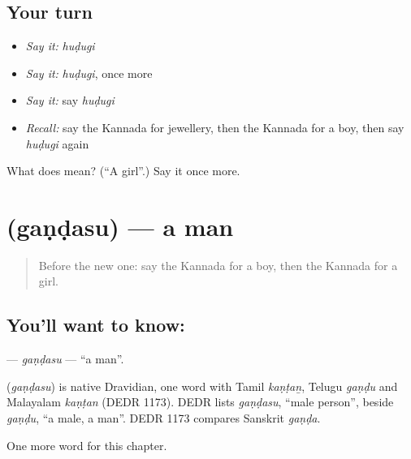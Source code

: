 \subsection*{Your turn}
\begin{itemize}
\raggedright
  \item \emph{Say it:} \emph{huḍugi}
  \item \emph{Say it:} \emph{huḍugi}, once more
  \item \emph{Say it:} say \emph{huḍugi}
  \item \emph{Recall:} say the Kannada for jewellery, then the Kannada for a boy, then say \emph{huḍugi} again
\end{itemize}

\begin{tcolorbox}[breakable,colback=teal!4,colframe=teal!35!black,title={Before you move on}]
What does  mean? (\textquotedblleft{}A girl\textquotedblright{}.) Say it once more.
\end{tcolorbox}
\section[\texorpdfstring{\kn{ಗಂಡಸು} (gaṇḍasu)}{ಗಂಡಸು (gaṇḍasu)}]{ (gaṇḍasu) — a man}

\label{lesson:KA-C263-gandasu}



\begin{quote}
Before the new one: say the Kannada for a boy, then the Kannada for a girl.
\end{quote}

\subsection*{You'll want to know: }
\textbf{} — \emph{gaṇḍasu} — \textquotedblleft{}a man\textquotedblright{}.

\begin{cousinweb}
\textbf{} (\emph{gaṇḍasu}) is native Dravidian, one word with Tamil \emph{kaṇṭaṉ}, Telugu \emph{gaṇḍu} and Malayalam \emph{kaṇṭan} (DEDR 1173). DEDR lists \emph{gaṇḍasu}, \textquotedblleft{}male person\textquotedblright{}, beside \emph{gaṇḍu}, \textquotedblleft{}a male, a man\textquotedblright{}. DEDR 1173 compares Sanskrit \emph{gaṇḍa}.
\end{cousinweb}

\begin{grammarlens}[title={What you've built}]
One more word for this chapter.
\end{grammarlens}

